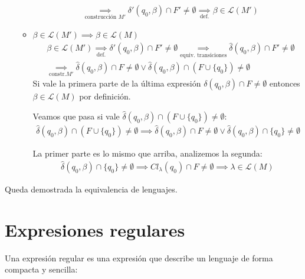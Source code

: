 \begin{itemize}
\begin{itemize}
\begin{align*}
                   & \underset{\text{construcción } M'}{\implies} \delta'(q_0,\beta)\cap F' \neq \emptyset \underset{\text{def.}}{\implies} \beta\in \mathcal{L}(M')
                \end{align*}
          \item \(\beta\in\mathcal{L}(M') \implies \beta\in\mathcal{L}(M)\)
                \begin{align*}
                   & \beta\in \mathcal{L}(M') \underset{\text{def.}}{\implies} \delta'(q_0,\beta)\cap F' \neq \emptyset \underset{\text{equiv. transiciones}}{\implies} \hat\delta(q_0,\beta)\cap F' \neq \emptyset \\
                   & \underset{\text{constr.} M'}{\implies} \hat\delta(q_0,\beta)\cap F \neq \emptyset \lor \hat\delta(q_0,\beta)\cap(F\cup\{q_0\}) \neq \emptyset
                \end{align*}
                Si vale la primera parte de la última expresión \(\delta(q_0,\beta)\cap F \neq \emptyset\) entonces \(\beta\in \mathcal{L}(M)\) por definición.

                Veamos que pasa si vale \(\hat\delta(q_0,\beta)\cap(F\cup\{q_0\}) \neq \emptyset\):
                \begin{align*}
                  \hat\delta(q_0,\beta)\cap(F\cup\{q_0\}) \neq \emptyset \implies \hat\delta(q_0,\beta)\cap F \neq \emptyset \lor \hat\delta(q_0,\beta)\cap\{q_0\} \neq \emptyset
                \end{align*}

                La primer parte es lo mismo que arriba, analizemos la segunda:
                \begin{align*}
                  \hat\delta(q_0,\beta)\cap\{q_0\} \neq \emptyset \implies Cl_\lambda(q_0)\cap F \neq \emptyset \implies \lambda\in \mathcal{L}(M)
                \end{align*}
        \end{itemize}
\end{itemize}
Queda demostrada la equivalencia de lenguajes.

\newpage
\section{Expresiones regulares}
Una expresión regular es una expresión que describe un lenguaje de forma compacta y sencilla:

